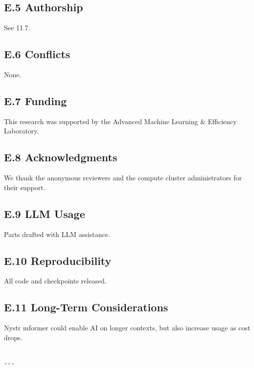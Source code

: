 \subsection{E.5 Authorship}
See  11.7.

\subsection{E.6 Conflicts}
None.

\subsection{E.7 Funding}
This research was supported by the Advanced Machine Learning \& Efficiency Laboratory.

\subsection{E.8 Acknowledgments}
We thank the anonymous reviewers and the compute cluster administrators for their support.

\subsection{E.9 LLM Usage}
Parts drafted with LLM assistance.

\subsection{E.10 Reproducibility}
All code and checkpoints released.

\subsection{E.11 Long-Term Considerations}
Nystr mformer could enable AI on longer contexts, but also increase usage 
as cost drops.
\begin{lstlisting}

---
\end{lstlisting}